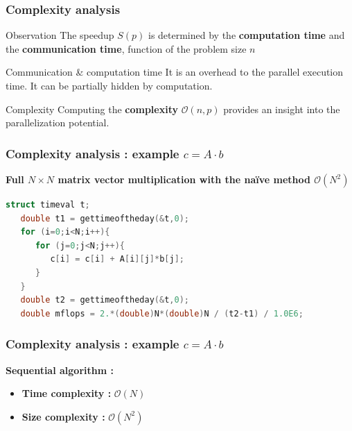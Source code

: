 \begin{frame}[containsverbatim]
\frametitle{Complexity analysis}
\begin{exampleblock}{Observation}
The speedup $S(p)$ is determined by the \textbf{computation time} and the \textbf{communication time}, function of the problem size $n$
\end{exampleblock}
\begin{exampleblock}{Communication \& computation time}
It is an overhead to the parallel execution time. It can be partially hidden by computation.
\end{exampleblock}
\begin{exampleblock}{Complexity}
Computing the \textbf{complexity} $\mathcal{O}(n,p)$ provides an insight into the parallelization potential.
\end{exampleblock}
\end{frame}



\begin{frame}[containsverbatim]
\frametitle{Complexity analysis : example $c = A \cdot b$}
\textbf{Full $N \times N $ matrix vector multiplication with the naïve method $\mathcal{O}(N^2)$}
\begin{lstlisting}[language=C,frame=lines]
   struct timeval t;
   double t1 = gettimeoftheday(&t,0);
   for (i=0;i<N;i++){
      for (j=0;j<N;j++){
         c[i] = c[i] + A[i][j]*b[j];
      }
   }
   double t2 = gettimeoftheday(&t,0);
   double mflops = 2.*(double)N*(double)N / (t2-t1) / 1.0E6;
\end{lstlisting}
\end{frame}


\begin{frame}[containsverbatim]
\frametitle{Complexity analysis : example $c = A \cdot b$}
\textbf{Sequential algorithm :}
\begin{itemize}
	\item{\textbf{Time complexity :} $\mathcal{O}(N)$}
	\item{\textbf{Size complexity :} $\mathcal{O}(N^2)$}
\end{itemize}
\end{frame}

